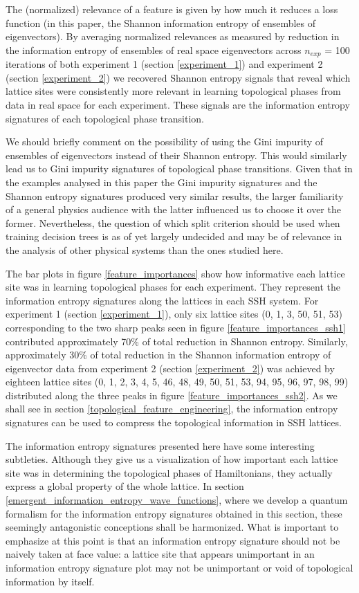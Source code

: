 \documentclass[10pt]{revtex4-1}
\begin{document}
The (normalized) relevance of a feature is given by how much it reduces a loss function (in this paper, the Shannon information entropy of ensembles of eigenvectors). By averaging normalized relevances as measured by reduction in the information entropy of ensembles of real space eigenvectors across $n_{exp}$ = 100 iterations of both experiment 1 (section \ref{experiment_1}) and experiment 2 (section \ref{experiment_2}) we recovered Shannon entropy signals that reveal which lattice sites were consistently more relevant in learning topological phases from data in real space for each experiment. These signals are the information entropy signatures of each topological phase transition. 

We should briefly comment on the possibility of using the Gini impurity of ensembles of eigenvectors \cite{friedman2001elements} instead of their Shannon entropy. This would similarly lead us to Gini impurity signatures of topological phase transitions. Given that in the examples analysed in this paper the Gini impurity signatures and the Shannon entropy signatures produced very similar results, the larger familiarity of a general physics audience with the latter influenced us to choose it over the former. Nevertheless, the question of which split criterion  should be used when training decision trees is as of yet largely undecided \cite{raileanu2004theoretical} and may be of relevance in the analysis of other physical systems than the ones studied here.       

The bar plots in figure \ref{feature_importances} show how informative each lattice site was in learning topological phases for each experiment. They represent the information entropy signatures along the lattices in each SSH system. For experiment 1 (section \ref{experiment_1}), only six lattice sites (0, 1, 3, 50, 51, 53) corresponding to the two sharp peaks seen in figure \ref{feature_importances_ssh1} contributed approximately 70\% of total reduction in Shannon entropy. Similarly, approximately 30\% of total reduction in the Shannon information entropy of eigenvector data from experiment 2 (section \ref{experiment_2}) was achieved by eighteen lattice sites (0, 1, 2, 3, 4, 5, 46, 48, 49, 50, 51, 53, 94, 95, 96, 97, 98, 99) distributed along the three peaks in figure \ref{feature_importances_ssh2}. As we shall see in section \ref{topological_feature_engineering}, the information entropy signatures can be used to compress the topological information in SSH lattices.

The information entropy signatures presented here have some interesting subtleties. Although they give us a visualization of how important each lattice site was in determining the topological phases of Hamiltonians, they actually express a global property of the whole lattice. In section \ref{emergent_information_entropy_wave_functions}, where we develop a quantum formalism for the information entropy signatures obtained in this section, these seemingly antagonistic conceptions shall be harmonized. What is important to emphasize at this point is that an information entropy signature should not be naively taken at face value: a lattice site that appears unimportant in an information entropy signature plot may not be unimportant or void of topological information by itself.
\end{document}
